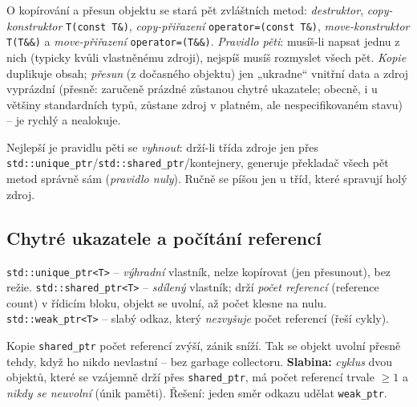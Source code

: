\documentclass[11pt,a4paper]{article}
\newcommand{\cd}{\lstinline[style=cpp]}
\begin{document}
\begin{definice}
O kopírování a přesun objektu se stará pět zvláštních metod: \emph{destruktor}, \emph{copy-konstruktor} \cd{T(const T&)}, \emph{copy-přiřazení} \cd{operator=(const T&)}, \emph{move-konstruktor} \cd{T(T&&)} a \emph{move-přiřazení} \cd{operator=(T&&)}. \emph{Pravidlo pěti}: musíš-li napsat jednu z nich (typicky kvůli vlastněnému zdroji), nejspíš musíš rozmyslet všech pět. \emph{Kopie} duplikuje obsah; \emph{přesun} (z dočasného objektu) jen „ukradne`` vnitřní data a zdroj vyprázdní (přesně: zaručeně prázdné zůstanou chytré ukazatele; obecně, i u většiny standardních typů, zůstane zdroj v platném, ale nespecifikovaném stavu) -- je rychlý a nealokuje.
\end{definice}

\begin{intuice}
Nejlepší je pravidlu pěti se \emph{vyhnout}: drží-li třída zdroje jen přes \cd{std::unique_ptr}/\cd{std::shared_ptr}/kontejnery, generuje překladač všech pět metod správně sám (\emph{pravidlo nuly}). Ručně se píšou jen u tříd, které spravují holý zdroj.
\end{intuice}

\subsection{Chytré ukazatele a počítání referencí}

\begin{definice}
\cd{std::unique_ptr<T>} -- \emph{výhradní} vlastník, nelze kopírovat (jen přesunout), bez režie. \cd{std::shared_ptr<T>} -- \emph{sdílený} vlastník; drží \emph{počet referencí} (reference count) v řídicím bloku, objekt se uvolní, až počet klesne na nulu. \cd{std::weak_ptr<T>} -- slabý odkaz, který \emph{nezvyšuje} počet referencí (řeší cykly).
\end{definice}

\begin{poznamka}
Kopie \cd{shared_ptr} počet referencí zvýší, zánik sníží. Tak se objekt uvolní přesně tehdy, když ho nikdo nevlastní -- bez garbage collectoru. \textbf{Slabina:} \emph{cyklus} dvou objektů, které se vzájemně drží přes \cd{shared_ptr}, má počet referencí trvale $\ge 1$ a \emph{nikdy se neuvolní} (únik paměti). Řešení: jeden směr odkazu udělat \cd{weak_ptr}.
\end{poznamka}
\end{document}
